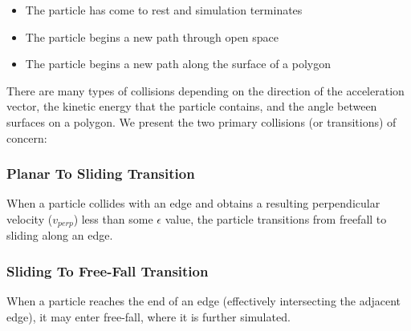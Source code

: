 \begin{itemize}
\item The particle has come to rest and simulation terminates
\item The particle begins a new path through open space
\item The particle begins a new path along the surface of a polygon
\end{itemize}

There are many types of collisions depending on the direction of the acceleration vector, the kinetic energy that the particle contains, and the angle between surfaces on a polygon. We present the two primary collisions (or transitions) of concern:

		\subsubsection{Planar To Sliding Transition}

When a particle collides with an edge and obtains a resulting perpendicular velocity ($v_{perp}$) less than some $\epsilon$ value, the particle transitions from freefall to sliding along an edge.




		\subsubsection{Sliding To Free-Fall Transition}

When a particle reaches the end of an edge (effectively intersecting the adjacent edge), it may enter free-fall, where it is further simulated.






